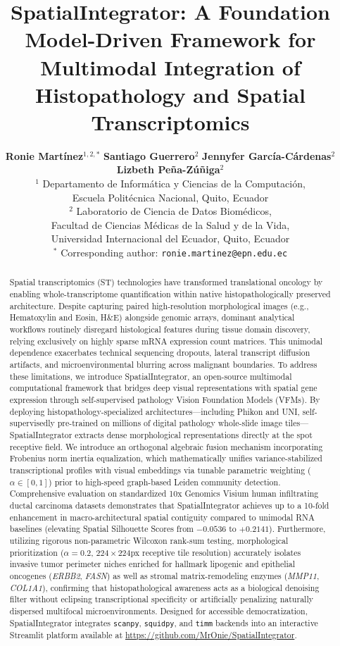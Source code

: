 \documentclass[11pt, a4paper]{article}
\title{\textbf{SpatialIntegrator: A Foundation Model-Driven Framework for Multimodal Integration of Histopathology and Spatial Transcriptomics}}
\author{
    \parbox{\textwidth}{\centering
        \textbf{Ronie Martínez}$^{1,2,*}$\quad
        \textbf{Santiago Guerrero}$^{2}$\quad
        \textbf{Jennyfer García-Cárdenas}$^{2}$\quad
        \textbf{Lizbeth Peña-Zúñiga}$^{2}$ \\[2ex]
        $^{1}$ \small Departamento de Informática y Ciencias de la Computación, \\
        Escuela Politécnica Nacional, Quito, Ecuador \\[1ex]
        $^{2}$ \small Laboratorio de Ciencia de Datos Biomédicos, \\
        Facultad de Ciencias Médicas de la Salud y de la Vida, \\
        Universidad Internacional del Ecuador, Quito, Ecuador \\[1.5ex]
        $^*$ \small Corresponding author: \texttt{ronie.martinez@epn.edu.ec}
    }
}
\date{}
\begin{document}
\maketitle

\begin{abstract}
Spatial transcriptomics (ST) technologies have transformed translational oncology by enabling whole-transcriptome quantification within native histopathologically preserved architecture. Despite capturing paired high-resolution morphological images (e.g., Hematoxylin and Eosin, H\&E) alongside genomic arrays, dominant analytical workflows routinely disregard histological features during tissue domain discovery, relying exclusively on highly sparse mRNA expression count matrices. This unimodal dependence exacerbates technical sequencing dropouts, lateral transcript diffusion artifacts, and microenvironmental blurring across malignant boundaries. To address these limitations, we introduce SpatialIntegrator, an open-source multimodal computational framework that bridges deep visual representations with spatial gene expression through self-supervised pathology Vision Foundation Models (VFMs). By deploying histopathology-specialized architectures—including Phikon and UNI, self-supervisedly pre-trained on millions of digital pathology whole-slide image tiles—SpatialIntegrator extracts dense morphological representations directly at the spot receptive field. We introduce an orthogonal algebraic fusion mechanism incorporating Frobenius norm inertia equalization, which mathematically unifies variance-stabilized transcriptional profiles with visual embeddings via tunable parametric weighting ($\alpha \in [0,1]$) prior to high-speed graph-based Leiden community detection. Comprehensive evaluation on standardized 10x Genomics Visium human infiltrating ductal carcinoma datasets demonstrates that SpatialIntegrator achieves up to a 10-fold enhancement in macro-architectural spatial contiguity compared to unimodal RNA baselines (elevating Spatial Silhouette Scores from $-0.0536$ to $+0.2141$). Furthermore, utilizing rigorous non-parametric Wilcoxon rank-sum testing, morphological prioritization ($\alpha=0.2$, $224\times224$px receptive tile resolution) accurately isolates invasive tumor perimeter niches enriched for hallmark lipogenic and epithelial oncogenes (\textit{ERBB2}, \textit{FASN}) as well as stromal matrix-remodeling enzymes (\textit{MMP11}, \textit{COL1A1}), confirming that histopathological awareness acts as a biological denoising filter without eclipsing transcriptional specificity or artificially penalizing naturally dispersed multifocal microenvironments. Designed for accessible democratization, SpatialIntegrator integrates \texttt{scanpy}, \texttt{squidpy}, and \texttt{timm} backends into an interactive Streamlit platform available at \url{https://github.com/MrOnie/SpatialIntegrator}.
\end{abstract}
\end{document}
